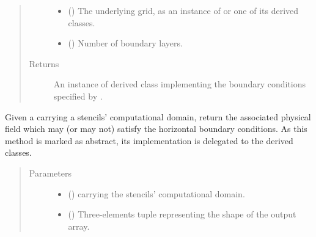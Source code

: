 \documentclass[letterpaper,10pt,english]{sphinxmanual}
\begin{document}
\begin{fulllineitems}
\begin{fulllineitems}
\begin{quote}
\begin{description}
\begin{itemize}
\item {} 
 () \textendash{} The underlying grid, as an instance of {\hyperref[\detokenize{api:grids.xyz_grid.XYZGrid}]{}} or one of
its derived classes.

\item {} 
 () \textendash{} Number of boundary layers.

\end{itemize}

\item[{Returns}] \leavevmode
An instance of derived class implementing the boundary conditions specified by .

\end{description}\end{quote}

\end{fulllineitems}


\begin{fulllineitems}
\label{\detokenize{api:dycore.horizontal_boundary.HorizontalBoundary.from_computational_to_physical_domain}}
Given a  carrying a stencils’ computational domain, return the associated physical
field which may (or may not) satisfy the horizontal boundary conditions.
As this method is marked as abstract, its implementation is delegated to the derived classes.
\begin{quote}\begin{description}
\item[{Parameters}] \leavevmode\begin{itemize}
\item {} 
 () \textendash{}  carrying the stencils’ computational domain.

\item {} 
 () \textendash{} Three-elements tuple representing the shape of the output array.


\end{itemize}
\end{description}
\end{quote}
\end{fulllineitems}
\end{fulllineitems}
\end{document}
